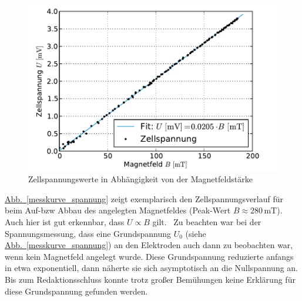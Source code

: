 \documentclass[11pt]{scrartcl}
\newcommand{\unit}[1]{\ensuremath{\,\mathrm{#1}}} %
\begin{document}
\begin{figure}[ht]
\begin{center}
\includegraphics[width=1.0\textwidth]{images/spannung.pdf}
\end{center}
\vspace{-1.5\baselineskip}
\caption{Zellspannungswerte in Abhängigkeit von der Magnetfeldstärke}
\label{spannung}
\end{figure}

\hyperref[messkurve_spannung]{Abb.~\ref{messkurve_spannung}} zeigt exemplarisch den Zellspannungsverlauf für beim Auf-bzw Abbau des angelegten Magnetfeldes (Peak-Wert $B \approx 280 \unit{mT}$). Auch hier ist gut erkennbar, dass $U \propto B$ gilt. \
Zu beachten war bei der Spannungsmessung, dass eine Grundspannung $U_0$ (siehe \hyperref[messkurve_spannung]{Abb.~\ref{messkurve_spannung}}) an den Elektroden auch dann zu beobachten war, wenn kein Magnetfeld angelegt wurde. Diese Grundspannung reduzierte anfangs in etwa exponentiell, dann näherte sie sich asymptotisch an die Nullspannung an. Bis zum Redaktionsschluss konnte trotz großer Bemühungen keine Erklärung für diese Grundspannung gefunden werden.  
\end{document}
